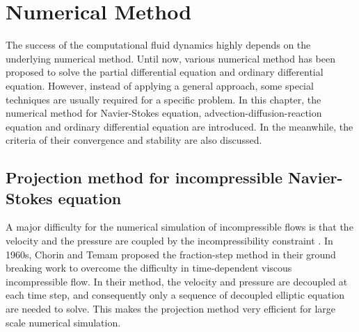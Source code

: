 \chapter{Numerical Method}
The success of the computational fluid dynamics highly depends on the underlying numerical method. Until now, various numerical method has been proposed to solve the partial differential equation and ordinary differential equation. However, instead of applying a general approach, some special techniques are usually required for a specific problem. In this chapter, the numerical method for Navier-Stokes equation, advection-diffusion-reaction equation and ordinary differential equation are introduced. In the meanwhile, the criteria of their convergence and stability are also discussed.

\section{Projection method for incompressible Navier-Stokes equation}
A major difficulty for the numerical simulation of incompressible flows is that the velocity and the pressure are coupled by the incompressibility constraint \cite{Guermond2006Overview}. In 1960s, Chorin and Temam proposed the fraction-step method in their ground breaking work \cite{Temam1969approximation, Chorin1968Numerical} to overcome the difficulty in time-dependent viscous incompressible flow. In their method, the velocity and pressure are decoupled at each time step, and consequently only a sequence of decoupled elliptic equation are needed to solve. This makes the projection method very efficient for large scale numerical simulation.

